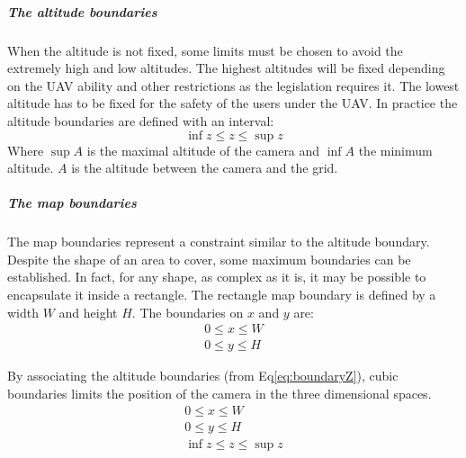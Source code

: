 \subparagraph{The altitude boundaries}\label{sec:altitudeBoundary}
 When the altitude is not fixed, some limits must be chosen to avoid the extremely high and low altitudes. The highest altitudes will be fixed depending on the UAV ability and other restrictions as the legislation requires it. The lowest altitude has to be fixed for the safety of the users under the UAV.  
In practice the  altitude boundaries are defined with an interval:
 \begin{equation}\label{eq:boundaryZ}
   \inf z\leq z\leq \sup z  
 \end{equation} 
 Where $\sup A$ is the maximal altitude of the camera and $\inf A$ the minimum altitude. $A$ is the altitude between the camera and the grid. %
 
 \subparagraph{The map boundaries} \label{sec:MapBoundaries}
The map boundaries represent a constraint similar to the altitude boundary. Despite the shape of an area to cover, some maximum boundaries can be established. In fact, for any shape, as complex as it is, it may be possible to encapsulate it inside a rectangle. The rectangle map boundary is defined by a width $W$ and height $H$. The boundaries on $x$ and $y$ are:
 \begin{equation}
  \begin{array}{lcl}
  	0\leq x\leq W \\
  	 0\leq y\leq H 
  \end{array} 
 \end{equation}  
 
By associating the altitude boundaries (from Eq\ref{eq:boundaryZ}), cubic boundaries limits the position of the camera in the three dimensional spaces. 
\begin{equation}\label{eq:3dBoundary}
  \begin{array}{lclcl}
  	0\leq x\leq W \\ 0\leq y\leq H  \\ \inf z\leq z\leq \sup z  
  \end{array} 
 \end{equation} 
 
